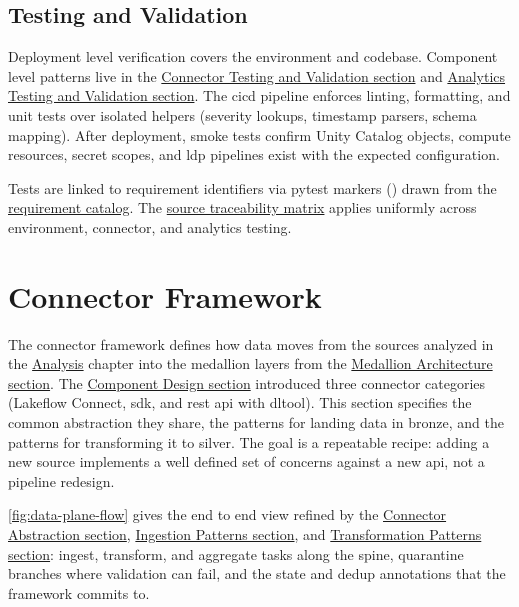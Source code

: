 
\subsection{Testing and Validation}

Deployment level verification covers the environment and codebase. Component level patterns live in the \hyperref[sec:connector-testing]{Connector Testing and Validation section} and \hyperref[sec:analytics-testing]{Analytics Testing and Validation section}. The \gls{cicd} pipeline enforces linting, formatting, and unit tests over isolated helpers (severity lookups, timestamp parsers, schema mapping). After deployment, smoke tests confirm Unity Catalog objects, compute resources, secret scopes, and \gls{ldp} pipelines exist with the expected configuration.

Tests are linked to requirement identifiers via pytest markers () drawn from the \href{https://vkraus.github.io/appsec-mvp/platform/reference/catalog/}{requirement catalog}. The \href{https://vkraus.github.io/appsec-mvp/platform/reference/catalog/\#per-source-traceability-matrix}{source traceability matrix} applies uniformly across environment, connector, and analytics testing.


\section{Connector Framework}
\label{sec:connector-framework}

The connector framework defines how data moves from the sources analyzed in the \hyperref[ch:analysis]{Analysis} chapter into the medallion layers from the \hyperref[sec:medallion-arch]{Medallion Architecture section}. The \hyperref[sec:component-design]{Component Design section} introduced three connector categories (Lakeflow Connect, \gls{sdk}, and \gls{rest} \gls{api} with \gls{dltool}). This section specifies the common abstraction they share, the patterns for landing data in bronze, and the patterns for transforming it to silver. The goal is a repeatable recipe: adding a new source implements a well defined set of concerns against a new \gls{api}, not a pipeline redesign.

\autoref{fig:data-plane-flow} gives the end to end view refined by the \hyperref[sec:connector-abstraction]{Connector Abstraction section}, \hyperref[sec:ingestion-patterns]{Ingestion Patterns section}, and \hyperref[sec:transformation-patterns]{Transformation Patterns section}: ingest, transform, and aggregate tasks along the spine, quarantine branches where validation can fail, and the state and dedup annotations that the framework commits to.

